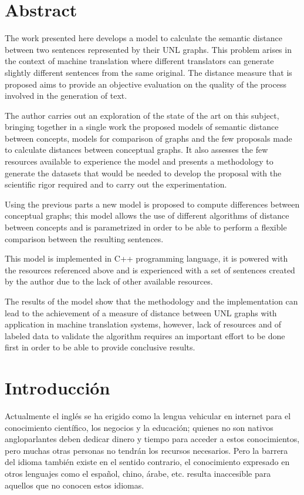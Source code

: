 \documentclass[a4paper,12pt,spanish]{book}
\begin{document}
\chapter*{Abstract}
The work presented here develops a model to calculate the semantic distance
between two sentences represented by their UNL graphs. This problem arises
in the context of machine translation where different translators can generate
slightly different sentences from the same original. The distance measure that
is proposed aims to provide an objective evaluation on the quality of the
process involved in the generation of text.

The author carries out an exploration of the state of the art on this subject,
bringing together in a single work the proposed models of semantic distance between
concepts, models for comparison of graphs and the few proposals made to calculate
distances between conceptual graphs. It also assesses the few resources available
to experience the model and presents a methodology to generate the datasets that
would be needed to develop the proposal with the scientific rigor required
and to carry out the experimentation.

Using the previous parts a new model is proposed to compute differences between
conceptual graphs; this model allows the use of different algorithms of distance
between concepts and is parametrized in order to be able to perform a flexible
comparison between the resulting sentences.

This model is implemented in C++ programming language, it is powered with the
resources referenced above and is experienced with a set of sentences created
by the author due to the lack of other available resources.

The results of the model show that the methodology and the implementation can
lead to the achievement of a measure of distance between UNL graphs with application
in machine translation systems, however, lack of resources and of labeled data
to validate the algorithm requires an important effort to be done first in order
to be able to provide conclusive results.
\cleardoublepage
{}
{}
\listoffigures

\cleardoublepage
{}
{}
\listoftables\newpage\mainmatter

\chapter{Introducción}
\label{0.intro:introduccion}\label{0.intro::doc}\label{0.intro:medida-de-distancia-en-grafos-unl}
Actualmente el inglés se ha erigido como la lengua vehicular en internet para el
conocimiento científico, los negocios y la educación; quienes no son nativos
angloparlantes deben dedicar dinero y tiempo para acceder a estos conocimientos,
pero muchas otras personas no tendrán los recursos necesarios. Pero la barrera del
idioma también existe en el sentido contrario, el conocimiento expresado en otros
lenguajes como el español, chino, árabe, etc. resulta inaccesible para aquellos
que no conocen estos idiomas.
\end{document}

